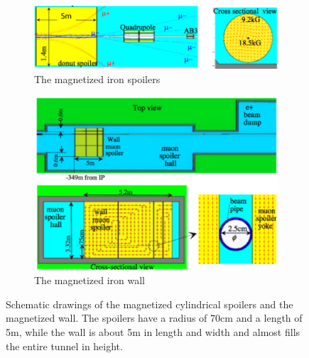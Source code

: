\documentclass[12pt]{article}
\begin{document}
\begin{figure}
    \centering
    \begin{subfigure}[b]{0.53\textwidth}
        \includegraphics[width=\textwidth]{figures/Spoiler.png}
        \caption{The magnetized iron spoilers}
	\label{fig:spoilers}
    \end{subfigure}
    \begin{subfigure}[b]{0.42\textwidth}
        \includegraphics[width=\textwidth]{figures/Muon_wall.pdf}
        \caption{The magnetized iron wall}
        \label{fig:wall}
    \end{subfigure}
    \caption[Schematic drawings of the shielding systems]{
    Schematic drawings of the magnetized cylindrical spoilers and the magnetized wall.
    The spoilers have a radius of \unit{70}{cm} and a length of \unit{5}{m}, while the wall is about \unit{5}{m} in length and width and almost fills the entire tunnel in height.
    }
    \label{fig:Spoilers_Wall}
\end{figure}
\end{document}
